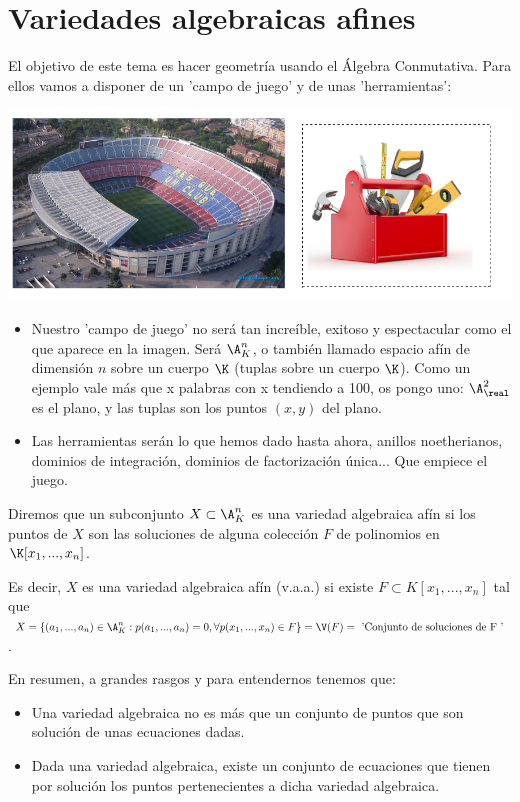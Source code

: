 \chapter{Variedades algebraicas afines}
El objetivo de este tema es hacer geometría usando el Álgebra Conmutativa. Para ellos vamos a disponer de un 'campo de juego' y de unas 'herramientas':

\begin{center}
	\includegraphics[scale=0.45]{img/vaa.png}
\end{center}

\begin{itemize}
	\item Nuestro 'campo de juego' no será tan increíble, exitoso y espectacular como el que aparece en la imagen. Será $\A^n_K$, o también llamado espacio afín de dimensión $n$ sobre un cuerpo $\K$ (tuplas sobre un cuerpo $\K$). Como un ejemplo vale más que x palabras con x tendiendo a 100, os pongo uno: $\A^2_{\real}$ es el plano, y las tuplas son los puntos $(x,y)$ del plano.
	\item Las herramientas serán lo que hemos dado hasta ahora, anillos noetherianos, dominios de integración, dominios de factorización única... Que empiece el juego.
\end{itemize}

\begin{defn}\label{def:variedad_algebraica}
	Diremos que un subconjunto $X\subset \A^n_K$ es una variedad algebraica afín si los puntos de $X$ son las soluciones de alguna colección $F$ de polinomios en $\K[x_1,...,x_n]$. 
	
	Es decir, $X$ es una variedad algebraica afín (v.a.a.) si existe $F \subset K[x_1,...,x_n]$ tal que $X=\{ (a_1,...,a_n) \in \A_K^n: p(a_1,...,a_n)=0,  \forall p(x_1,...,x_n) \in F \} = \V(F)=\text{ 'Conjunto de soluciones de F '}$. 
\end{defn}

En resumen, a grandes rasgos y para entendernos tenemos que:
\begin{itemize}
	\item Una variedad algebraica no es más que un conjunto de puntos que son solución de unas ecuaciones dadas.
	\item Dada una variedad algebraica, existe un conjunto de ecuaciones que tienen por solución los puntos pertenecientes a dicha variedad algebraica.
\end{itemize}

